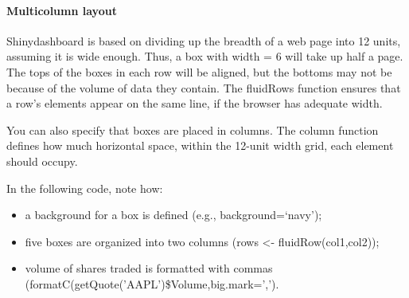 \documentclass[
]{article}
\begin{document}
\hypertarget{multicolumn-layout}{%
\paragraph*{Multicolumn layout}\label{multicolumn-layout}}

Shinydashboard is based on dividing up the breadth of a web page into 12
units, assuming it is wide enough. Thus, a box with width = 6 will take
up half a page. The tops of the boxes in each row will be aligned, but
the bottoms may not be because of the volume of data they contain. The
fluidRows function ensures that a row's elements appear on the same
line, if the browser has adequate width.

You can also specify that boxes are placed in columns. The column
function defines how much horizontal space, within the 12-unit width
grid, each element should occupy.

In the following code, note how:

\begin{itemize}
\item
  a background for a box is defined (e.g., background=`navy');
\item
  five boxes are organized into two columns (rows \textless- fluidRow(col1,col2));
\item
  volume of shares traded is formatted with commas (formatC(getQuote('AAPL')\$Volume,big.mark=',').
\end{itemize}
\end{document}

